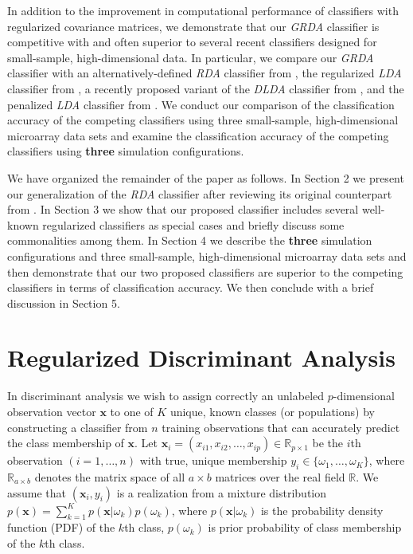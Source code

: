 \documentclass[11pt]{article}
\begin{document}
In addition to the improvement in computational performance of classifiers with regularized covariance matrices, we demonstrate that our \emph{GRDA} classifier is competitive with and often superior to several recent classifiers designed for small-sample, high-dimensional data. In particular, we compare our \emph{GRDA} classifier with an alternatively-defined \emph{RDA} classifier from \cite*{Hastie:2008dt}, the regularized \emph{LDA} classifier from \cite{Guo:2007te}, a recently proposed variant of the \emph{DLDA} classifier from \cite*{Tong:2012hw}, and the penalized \emph{LDA} classifier from \cite{Witten:2011kc}. We conduct our comparison of the classification accuracy of the competing classifiers using three small-sample, high-dimensional microarray data sets and examine the classification accuracy of the competing classifiers using \textbf{three} simulation configurations.

We have organized the remainder of the paper as follows. In Section 2 we present our generalization of the \emph{RDA} classifier after reviewing its original counterpart from \cite{Friedman:1989tm}. In Section 3 we show that our proposed classifier includes several well-known regularized classifiers as special cases and briefly discuss some commonalities among them. In Section 4 we describe the \textbf{three} simulation configurations and three small-sample, high-dimensional microarray data sets and then demonstrate that our two proposed classifiers are superior to the competing classifiers in terms of classification accuracy. We then conclude with a brief discussion in Section 5.

\section{Regularized Discriminant Analysis}
\label{sec:rda}

In discriminant analysis we wish to assign correctly an unlabeled $p$-dimensional observation vector $\bm x$ to one of $K$ unique, known classes (or populations) by constructing a classifier from $n$ training observations that can accurately predict the class membership of $\bm x$. Let $\bm x_i = (x_{i1}, x_{i2}, \ldots, x_{ip}) \in \mathbb{R}_{p \times 1}$ be the $i$th observation $(i = 1, \ldots, n)$ with true, unique membership $y_i \in \{\omega_1, \ldots, \omega_K\}$, where $\mathbb{R}_{a \times b}$ denotes the matrix space of all $a \times b$ matrices over the real field $\mathbb{R}$. We assume that $(\bm x_i, y_i)$ is a realization from a mixture distribution $p(\bm x) = \sum_{k=1}^K p(\bm x | \omega_k) p(\omega_k)$, where $p(\bm x | \omega_k)$ is the probability density function (PDF) of the $k$th class, $p(\omega_k)$ is prior probability of class membership of the $k$th class.
\end{document}
